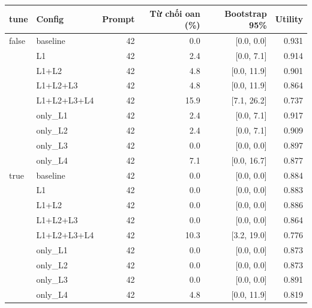 \begin{tabular}{llrrrr}
\toprule
tune & Config & Prompt & Từ chối oan (\%) & Bootstrap 95\% & Utility \\
\midrule
false & baseline & 42 & 0.0 & [0.0, 0.0] & 0.931 \\
 & L1 & 42 & 2.4 & [0.0, 7.1] & 0.914 \\
 & L1+L2 & 42 & 4.8 & [0.0, 11.9] & 0.901 \\
 & L1+L2+L3 & 42 & 4.8 & [0.0, 11.9] & 0.864 \\
 & L1+L2+L3+L4 & 42 & 15.9 & [7.1, 26.2] & 0.737 \\
 & only\_L1 & 42 & 2.4 & [0.0, 7.1] & 0.917 \\
 & only\_L2 & 42 & 2.4 & [0.0, 7.1] & 0.909 \\
 & only\_L3 & 42 & 0.0 & [0.0, 0.0] & 0.897 \\
 & only\_L4 & 42 & 7.1 & [0.0, 16.7] & 0.877 \\
\midrule
true & baseline & 42 & 0.0 & [0.0, 0.0] & 0.884 \\
 & L1 & 42 & 0.0 & [0.0, 0.0] & 0.883 \\
 & L1+L2 & 42 & 0.0 & [0.0, 0.0] & 0.886 \\
 & L1+L2+L3 & 42 & 0.0 & [0.0, 0.0] & 0.864 \\
 & L1+L2+L3+L4 & 42 & 10.3 & [3.2, 19.0] & 0.776 \\
 & only\_L1 & 42 & 0.0 & [0.0, 0.0] & 0.873 \\
 & only\_L2 & 42 & 0.0 & [0.0, 0.0] & 0.873 \\
 & only\_L3 & 42 & 0.0 & [0.0, 0.0] & 0.891 \\
 & only\_L4 & 42 & 4.8 & [0.0, 11.9] & 0.819 \\
\bottomrule
\end{tabular}
